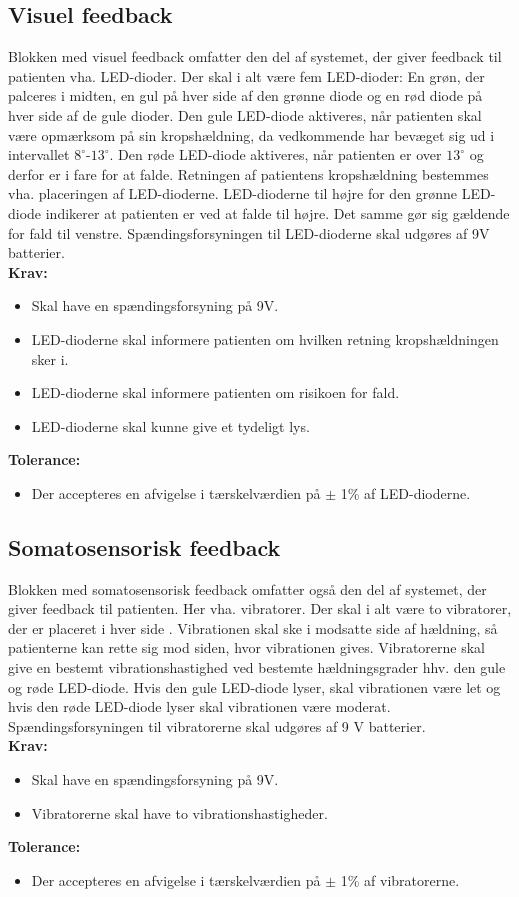 \subsection{Visuel feedback}
Blokken med visuel feedback omfatter den del af systemet, der giver feedback til patienten vha. LED-dioder. Der skal i alt være fem LED-dioder: En grøn, der palceres i midten, en gul på hver side af den grønne diode og en rød diode på hver side af de gule dioder. Den gule LED-diode aktiveres, når patienten skal være opmærksom på sin kropshældning, da vedkommende har bevæget sig ud i intervallet $8^{\circ}$-$13^{\circ}$. Den røde LED-diode aktiveres, når patienten er over $13^{\circ}$ og derfor er i fare for at falde. Retningen af patientens kropshældning bestemmes vha. placeringen af LED-dioderne. LED-dioderne til højre for den grønne LED-diode indikerer at patienten er ved at falde til højre. Det samme gør sig gældende for fald til venstre. Spændingsforsyningen til LED-dioderne skal udgøres af 9V batterier.   
\\
\textbf{Krav:}
\begin{itemize}
\item Skal have en spændingsforsyning på 9V.
\item LED-dioderne skal informere patienten om hvilken retning kropshældningen sker i.
\item LED-dioderne skal informere patienten om risikoen for fald.
\item LED-dioderne skal kunne give et tydeligt lys.
\end{itemize}
\textbf{Tolerance:}
\begin{itemize}
\item Der accepteres en afvigelse i tærskelværdien på $\pm$ 1\% af LED-dioderne.
\end{itemize}
\subsection{Somatosensorisk feedback} 
Blokken med somatosensorisk feedback omfatter også den del af systemet, der giver feedback til patienten. Her vha. vibratorer. Der skal i alt være to vibratorer, der er placeret i hver side . Vibrationen skal ske i modsatte side af hældning, så patienterne kan rette sig mod siden, hvor vibrationen gives. Vibratorerne skal give en bestemt vibrationshastighed ved bestemte hældningsgrader hhv. den gule og røde LED-diode. Hvis den gule LED-diode lyser, skal vibrationen være let og hvis den røde LED-diode lyser skal vibrationen være moderat. Spændingsforsyningen til vibratorerne skal udgøres af 9 V batterier.
\\
\textbf{Krav:}
\begin{itemize}
\item Skal have en spændingsforsyning på 9V.
\item Vibratorerne skal have to vibrationshastigheder.
\end{itemize}
\textbf{Tolerance:}
\begin{itemize}
\item Der accepteres en afvigelse i tærskelværdien på $\pm$ 1\% af vibratorerne.
\end{itemize}

